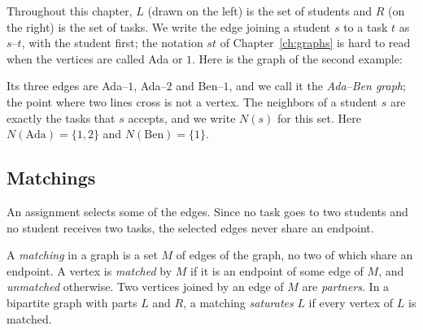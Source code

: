 Throughout this chapter, $L$ (drawn on the left) is the set of students and $R$ (on the right) is the set of tasks. We write the edge joining a student $s$ to a task $t$ as $s$--$t$, with the student first; the notation $st$ of Chapter~\ref{ch:graphs} is hard to read when the vertices are called Ada or $1$. Here is the graph of the second example:
\begin{center}
\end{center}
Its three edges are Ada--$1$, Ada--$2$ and Ben--$1$, and we call it the \emph{Ada--Ben graph}; the point where two lines cross is not a vertex. The neighbors of a student $s$ are exactly the tasks that $s$ accepts, and we write $N(s)$ for this set. Here $N(\text{Ada})=\{1,2\}$ and $N(\text{Ben})=\{1\}$.

\subsection*{Matchings}
An assignment selects some of the edges. Since no task goes to two students and no student receives two tasks, the selected edges never share an endpoint.

\par\noindent\begin{minipage}{\linewidth}
\begin{definition}[Matching]\label{ch08:def:matching}
A \emph{matching} in a graph is a set $M$ of edges of the graph, no two of which share an endpoint. A vertex is \emph{matched} by $M$ if it is an endpoint of some edge of $M$, and \emph{unmatched} otherwise. Two vertices joined by an edge of $M$ are \emph{partners}. In a bipartite graph with parts $L$ and $R$, a matching \emph{saturates} $L$ if every vertex of $L$ is matched.
\end{definition}
\end{minipage}\par

